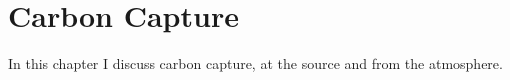 \setchapterpreamble[u]{\margintoc}
\chapter{Carbon Capture}

In this chapter I discuss carbon capture, at the source and from the atmosphere.